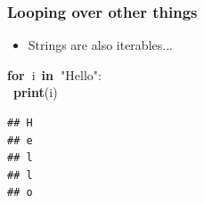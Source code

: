 \documentclass{beamer}\usepackage[]{graphicx}\usepackage[]{color}
\makeatletter
\newcommand{\hlstr}[1]{\textcolor[rgb]{0.192,0.494,0.8}{#1}}%
\newcommand{\hlopt}[1]{\textcolor[rgb]{0,0,0}{#1}}%
\newcommand{\hlstd}[1]{\textcolor[rgb]{0.345,0.345,0.345}{#1}}%
\newcommand{\hlkwa}[1]{\textcolor[rgb]{0.161,0.373,0.58}{\textbf{#1}}}%
\newenvironment{kframe}{%
 \def\at@end@of@kframe{}%
 \ifinner\ifhmode%
  \def\at@end@of@kframe{\end{minipage}}%
  \begin{minipage}{\columnwidth}%
 \fi\fi%
 \def\FrameCommand##1{\hskip\@totalleftmargin \hskip-\fboxsep
 \colorbox{shadecolor}{##1}\hskip-\fboxsep
     \hskip-\linewidth \hskip-\@totalleftmargin \hskip\columnwidth}%
 \MakeFramed {\advance\hsize-\width
   \@totalleftmargin\z@ \linewidth\hsize
   \@setminipage}}%
 {\par\unskip\endMakeFramed%
 \at@end@of@kframe}
\newenvironment{knitrout}{}{} %
\makeatother
\begin{document}
\begin{frame}[fragile]
\frametitle{Looping over other things}
\begin{itemize}
	\item Strings are also iterables... 

\end{itemize}
\begin{knitrout}
\color{fgcolor}\begin{kframe}
\noindent
\ttfamily
\hlstd{}\hlkwa{for\ }\hlstd{i\ }\hlkwa{in\ }\hlstd{}\hlstr{"Hello"}\hlstd{}\hlopt{:}\hspace*{\fill}\\
\hlstd{\ }\hlkwa{print}\hlstd{}\hlopt{(}\hlstd{i}\hlopt{)}\hlstd{}\hspace*{\fill}
\mbox{}
\normalfont

\begin{verbatim}
## H
## e
## l
## l
## o
\end{verbatim}
\end{kframe}
\end{knitrout}
\end{frame}
\end{document}
